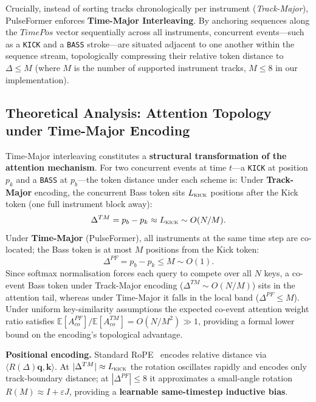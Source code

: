 \documentclass[conference]{IEEEtran}
\begin{document}
Crucially, instead of sorting tracks chronologically per instrument (\textit{Track-Major}), PulseFormer enforces \textbf{Time-Major Interleaving}. By anchoring sequences along the $TimePos$ vector sequentially across all instruments, concurrent events---such as a \texttt{KICK} and a \texttt{BASS} stroke---are situated adjacent to one another within the sequence stream, topologically compressing their relative token distance to $\Delta \leq M$ (where $M$ is the number of supported instrument tracks, $M \leq 8$ in our implementation).

\subsection{Theoretical Analysis: Attention Topology under Time-Major Encoding}
\label{sec:attention_topology}

Time-Major interleaving constitutes a \textbf{structural transformation of the attention mechanism}. For two concurrent events at time $t$—a \texttt{KICK} at position $p_k$ and a \texttt{BASS} at $p_b$—the token distance under each scheme is:
\noindent
Under \textbf{Track-Major} encoding, the concurrent Bass token sits $L_{\textsc{kick}}$ positions after the Kick token (one full instrument block away):
\begin{equation}\label{eq:track_dist}
  \Delta^{TM} = p_b - p_k \approx L_{\textsc{kick}} \sim O(N/M).
\end{equation}
Under \textbf{Time-Major} (PulseFormer), all instruments at the same time step are co-located; the Bass token is at most $M$ positions from the Kick token:
\begin{equation}\label{eq:time_dist}
  \Delta^{PF} = p_b - p_k \leq M \sim O(1).
\end{equation}
Since softmax normalisation forces each query to compete over all $N$ keys, a co-event Bass token under Track-Major encoding ($\Delta^{TM}\!\sim\!O(N/M)$) sits in the attention tail, whereas under Time-Major it falls in the local band ($\Delta^{PF}\!\leq\!M$). Under uniform key-similarity assumptions the expected co-event attention weight ratio satisfies $\mathbb{E}[A^{PF}_{co}]/\mathbb{E}[A^{TM}_{co}] = O(N/M^2) \gg 1$, providing a formal lower bound on the encoding's topological advantage.

\textbf{Positional encoding.} Standard RoPE~\cite{su2024roformer} encodes relative distance via $\langle R(\Delta)\mathbf{q},\mathbf{k}\rangle$. At $|\Delta^{TM}|\approx L_{\textsc{kick}}$ the rotation oscillates rapidly and encodes only track-boundary distance; at $|\Delta^{PF}|\leq 8$ it approximates a small-angle rotation $R(M)\approx I+\varepsilon J$, providing a \textbf{learnable same-timestep inductive bias}.
\end{document}
